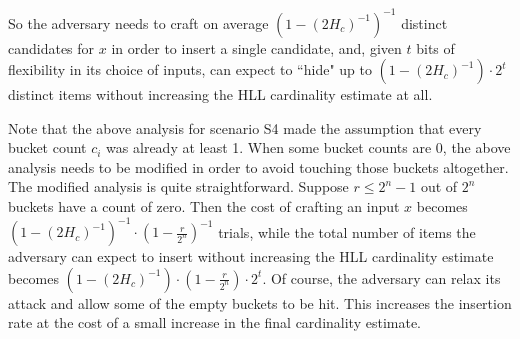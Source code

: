 \documentclass{IEEEtran}
\begin{document}
So the adversary needs to craft on average $(1-(2H_c)^{-1})^{-1}$ distinct candidates for $x$ in order to insert a single candidate, and, given $t$ bits of flexibility in its choice of inputs, can expect to ``hide" up to $(1-(2H_c)^{-1}) \cdot 2^t$ distinct items without increasing the HLL cardinality estimate at all.


Note that the above analysis for scenario S4 made the assumption that every bucket count $c_i$ was already at least 1. When some bucket counts are 0, the above analysis needs to be modified in order to avoid touching those buckets altogether. The modified analysis is quite straightforward. Suppose $r \le 2^n-1$ out of $2^n$ buckets have a count of zero. Then the cost of crafting an input $x$ becomes $(1-(2H_c)^{-1})^{-1} \cdot (1- \frac{r}{2^n})^{-1}$ trials, while the total number of items the adversary can expect to insert without increasing the HLL cardinality estimate becomes $(1-(2H_c)^{-1}) \cdot (1- \frac{r}{2^n})\cdot 2^t$. Of course, the adversary can relax its attack and allow some of the empty buckets to be hit. This increases the insertion rate at the cost of a small increase in the final cardinality estimate.
\end{document}
